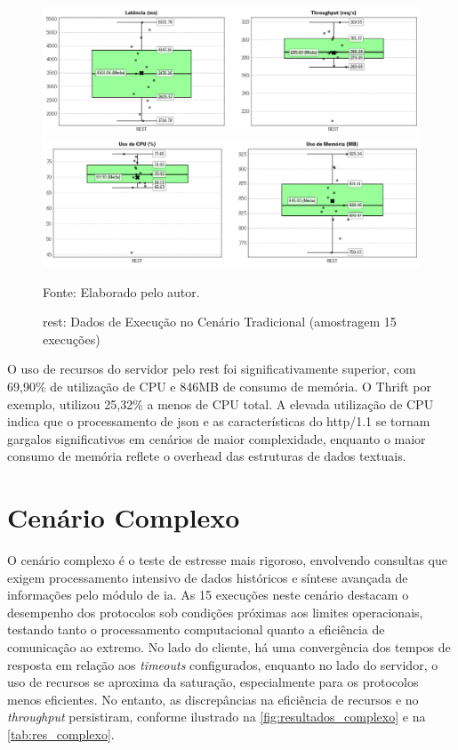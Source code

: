 \begin{figure}[H]
    \caption{\gls{rest}: Dados de Execução no Cenário Tradicional (amostragem 15 execuções)}
    \label{fig:5-Tradicional-REST-k6}
    \centering
    \includegraphics[width=1\linewidth]{imagens//resultados/5-resultados-Tradicional-REST-k6.png}
    \includegraphics[width=1\linewidth]{imagens//resultados/5-resultados-Tradicional-REST-prometheus.png}    
    {\par \raggedright \footnotesize Fonte: Elaborado pelo autor.\par}
\end{figure}

O uso de recursos do servidor pelo \gls{rest} foi significativamente superior, com 69,90\% de utilização de CPU e 846MB de consumo de memória. O Thrift por exemplo, utilizou 25,32\% a menos de CPU total. A elevada utilização de CPU indica que o processamento de \acrshort{json} e as características do \acrshort{http}/1.1 se tornam gargalos significativos em cenários de maior complexidade, enquanto o maior consumo de memória reflete o overhead das estruturas de dados textuais.

\section{Cenário Complexo}

O cenário complexo é o teste de estresse mais rigoroso, envolvendo consultas que exigem processamento intensivo de dados históricos e síntese avançada de informações pelo módulo de \acrfull{ia}. As 15 execuções neste cenário destacam o desempenho dos protocolos sob condições próximas aos limites operacionais, testando tanto o processamento computacional quanto a eficiência de comunicação ao extremo. No lado do cliente, há uma convergência dos tempos de resposta em relação aos \textit{timeouts} configurados, enquanto no lado do servidor, o uso de recursos se aproxima da saturação, especialmente para os protocolos menos eficientes. No entanto, as discrepâncias na eficiência de recursos e no \textit{throughput} persistiram, conforme ilustrado na \autoref{fig:resultados_complexo} e na \autoref{tab:res_complexo}.



